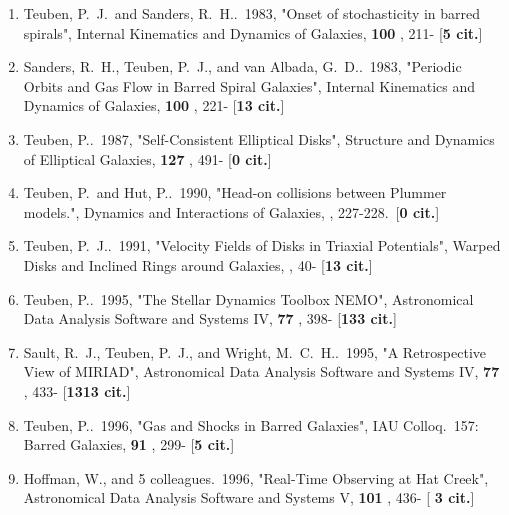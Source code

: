 \documentclass[11pt,letterpaper]{article}
\begin{document}
\begin{enumerate}[resume,label=\textbf{\arabic*}.]


\item  
Teuben, P.~J.~and Sanders, R.~H..\  1983,  "Onset of stochasticity in 
barred spirals", Internal Kinematics and Dynamics of Galaxies,  {\bf 100} , 
211- [{\bf 5 cit.}] 

\item  
Sanders, R.~H., Teuben, P.~J., and van Albada, G.~D..\  1983,  "Periodic 
Orbits and Gas Flow in Barred Spiral Galaxies", Internal Kinematics and 
Dynamics of Galaxies,  {\bf 100} , 221- [{\bf 13 cit.}] 

\item  
Teuben, P..\  1987,  "Self-Consistent Elliptical Disks", Structure and 
Dynamics of Elliptical Galaxies,  {\bf 127} , 491- [{\bf 0 cit.}] 


\item  
Teuben, P.~and Hut, P..\  1990,  "Head-on collisions between Plummer 
models.", Dynamics and Interactions of Galaxies,  , 227-228.\  [{\bf 0 
cit.}] 

\item  
Teuben, P.~J..\  1991,  "Velocity Fields of Disks in Triaxial Potentials", 
Warped Disks and Inclined Rings around Galaxies,  , 40- [{\bf 13 cit.}] 





\item  
Teuben, P..\  1995,  "The Stellar Dynamics Toolbox NEMO", Astronomical Data 
Analysis Software and Systems IV,  {\bf 77} , 398- [{\bf 133 cit.}] 

\item  
Sault, R.~J., Teuben, P.~J., and Wright, M.~C.~H..\  1995,  "A 
Retrospective View of MIRIAD", Astronomical Data Analysis Software and 
Systems IV,  {\bf 77} , 433- [{\bf 1313 cit.}] 

\item  
Teuben, P..\  1996,  "Gas and Shocks in Barred Galaxies", IAU Colloq.~157: 
Barred Galaxies,  {\bf 91} , 299- [{\bf 5 cit.}] 

\item  
Hoffman, W., and 5 colleagues.\  1996,  "Real-Time Observing at Hat Creek", 
Astronomical Data Analysis Software and Systems V,  {\bf 101} , 436- [{\bf 
3 cit.}] 






\end{enumerate}
\end{document}
